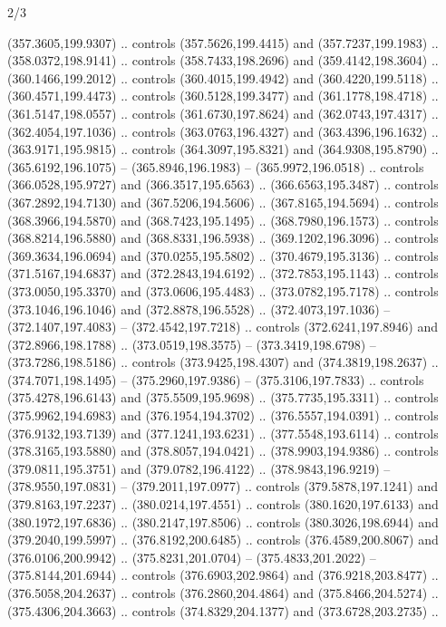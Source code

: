 \begin{flagdescription}{2/3}
\begin{scope}[xshift=0.5\flaglength,yshift=0.5\flagwidth,scale=\flagwidth/495.65]
\begin{scope}[y=0.8pt, x=0.8pt, yscale=-1,shift={(-463.76,-309.78)}]
  (357.3605,199.9307) .. controls (357.5626,199.4415) and (357.7237,199.1983) ..
  (358.0372,198.9141) .. controls (358.7433,198.2696) and (359.4142,198.3604) ..
  (360.1466,199.2012) .. controls (360.4015,199.4942) and (360.4220,199.5118) ..
  (360.4571,199.4473) .. controls (360.5128,199.3477) and (361.1778,198.4718) ..
  (361.5147,198.0557) .. controls (361.6730,197.8624) and (362.0743,197.4317) ..
  (362.4054,197.1036) .. controls (363.0763,196.4327) and (363.4396,196.1632) ..
  (363.9171,195.9815) .. controls (364.3097,195.8321) and (364.9308,195.8790) ..
  (365.6192,196.1075) -- (365.8946,196.1983) -- (365.9972,196.0518) .. controls
  (366.0528,195.9727) and (366.3517,195.6563) .. (366.6563,195.3487) .. controls
  (367.2892,194.7130) and (367.5206,194.5606) .. (367.8165,194.5694) .. controls
  (368.3966,194.5870) and (368.7423,195.1495) .. (368.7980,196.1573) .. controls
  (368.8214,196.5880) and (368.8331,196.5938) .. (369.1202,196.3096) .. controls
  (369.3634,196.0694) and (370.0255,195.5802) .. (370.4679,195.3136) .. controls
  (371.5167,194.6837) and (372.2843,194.6192) .. (372.7853,195.1143) .. controls
  (373.0050,195.3370) and (373.0606,195.4483) .. (373.0782,195.7178) .. controls
  (373.1046,196.1046) and (372.8878,196.5528) .. (372.4073,197.1036) --
  (372.1407,197.4083) -- (372.4542,197.7218) .. controls (372.6241,197.8946) and
  (372.8966,198.1788) .. (373.0519,198.3575) -- (373.3419,198.6798) --
  (373.7286,198.5186) .. controls (373.9425,198.4307) and (374.3819,198.2637) ..
  (374.7071,198.1495) -- (375.2960,197.9386) -- (375.3106,197.7833) .. controls
  (375.4278,196.6143) and (375.5509,195.9698) .. (375.7735,195.3311) .. controls
  (375.9962,194.6983) and (376.1954,194.3702) .. (376.5557,194.0391) .. controls
  (376.9132,193.7139) and (377.1241,193.6231) .. (377.5548,193.6114) .. controls
  (378.3165,193.5880) and (378.8057,194.0421) .. (378.9903,194.9386) .. controls
  (379.0811,195.3751) and (379.0782,196.4122) .. (378.9843,196.9219) --
  (378.9550,197.0831) -- (379.2011,197.0977) .. controls (379.5878,197.1241) and
  (379.8163,197.2237) .. (380.0214,197.4551) .. controls (380.1620,197.6133) and
  (380.1972,197.6836) .. (380.2147,197.8506) .. controls (380.3026,198.6944) and
  (379.2040,199.5997) .. (376.8192,200.6485) .. controls (376.4589,200.8067) and
  (376.0106,200.9942) .. (375.8231,201.0704) -- (375.4833,201.2022) --
  (375.8144,201.6944) .. controls (376.6903,202.9864) and (376.9218,203.8477) ..
  (376.5058,204.2637) .. controls (376.2860,204.4864) and (375.8466,204.5274) ..
  (375.4306,204.3663) .. controls (374.8329,204.1377) and (373.6728,203.2735) ..

\end{scope}
\end{scope}
\end{flagdescription}
